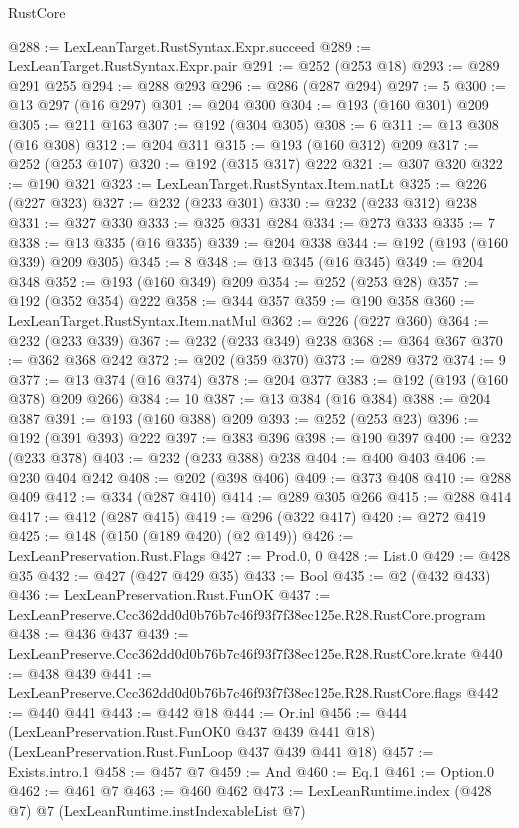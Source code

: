 \begin{lexlean}{RustCore}
\begin{coremodule}
@288 := LexLeanTarget.RustSyntax.Expr.succeed
@289 := LexLeanTarget.RustSyntax.Expr.pair
@291 := @252 (@253 @18)
@293 := @289 @291 @255
@294 := @288 @293
@296 := @286 (@287 @294)
@297 := 5
@300 := @13 @297 (@16 @297)
@301 := @204 @300
@304 := @193 (@160 @301) @209
@305 := @211 @163
@307 := @192 (@304 @305)
@308 := 6
@311 := @13 @308 (@16 @308)
@312 := @204 @311
@315 := @193 (@160 @312) @209
@317 := @252 (@253 @107)
@320 := @192 (@315 @317) @222
@321 := @307 @320
@322 := @190 @321
@323 := LexLeanTarget.RustSyntax.Item.natLt
@325 := @226 (@227 @323)
@327 := @232 (@233 @301)
@330 := @232 (@233 @312) @238
@331 := @327 @330
@333 := @325 @331 @284
@334 := @273 @333
@335 := 7
@338 := @13 @335 (@16 @335)
@339 := @204 @338
@344 := @192 (@193 (@160 @339) @209 @305)
@345 := 8
@348 := @13 @345 (@16 @345)
@349 := @204 @348
@352 := @193 (@160 @349) @209
@354 := @252 (@253 @28)
@357 := @192 (@352 @354) @222
@358 := @344 @357
@359 := @190 @358
@360 := LexLeanTarget.RustSyntax.Item.natMul
@362 := @226 (@227 @360)
@364 := @232 (@233 @339)
@367 := @232 (@233 @349) @238
@368 := @364 @367
@370 := @362 @368 @242
@372 := @202 (@359 @370)
@373 := @289 @372
@374 := 9
@377 := @13 @374 (@16 @374)
@378 := @204 @377
@383 := @192 (@193 (@160 @378) @209 @266)
@384 := 10
@387 := @13 @384 (@16 @384)
@388 := @204 @387
@391 := @193 (@160 @388) @209
@393 := @252 (@253 @23)
@396 := @192 (@391 @393) @222
@397 := @383 @396
@398 := @190 @397
@400 := @232 (@233 @378)
@403 := @232 (@233 @388) @238
@404 := @400 @403
@406 := @230 @404 @242
@408 := @202 (@398 @406)
@409 := @373 @408
@410 := @288 @409
@412 := @334 (@287 @410)
@414 := @289 @305 @266
@415 := @288 @414
@417 := @412 (@287 @415)
@419 := @296 (@322 @417)
@420 := @272 @419
@425 := @148 (@150 (@189 @420) (@2 @149))
@426 := LexLeanPreservation.Rust.Flags
@427 := Prod.{0, 0}
@428 := List.{0}
@429 := @428 @35
@432 := @427 (@427 @429 @35)
@433 := Bool
@435 := @2 (@432 @433)
@436 := LexLeanPreservation.Rust.FunOK
@437 := LexLeanPreserve.Ccc362dd0d0b76b7c46f93f7f38ec125e.R28.RustCore.program
@438 := @436 @437
@439 := LexLeanPreserve.Ccc362dd0d0b76b7c46f93f7f38ec125e.R28.RustCore.krate
@440 := @438 @439
@441 := LexLeanPreserve.Ccc362dd0d0b76b7c46f93f7f38ec125e.R28.RustCore.flags
@442 := @440 @441
@443 := @442 @18
@444 := Or.inl
@456 := @444
    (LexLeanPreservation.Rust.FunOK0 @437 @439 @441 @18)
    (LexLeanPreservation.Rust.FunLoop @437 @439 @441 @18)
@457 := Exists.intro.{1}
@458 := @457 @7
@459 := And
@460 := Eq.{1}
@461 := Option.{0}
@462 := @461 @7
@463 := @460 @462
@473 := LexLeanRuntime.index
    (@428 @7)
    @7
    (LexLeanRuntime.instIndexableList @7)

\end{coremodule}
\end{lexlean}
